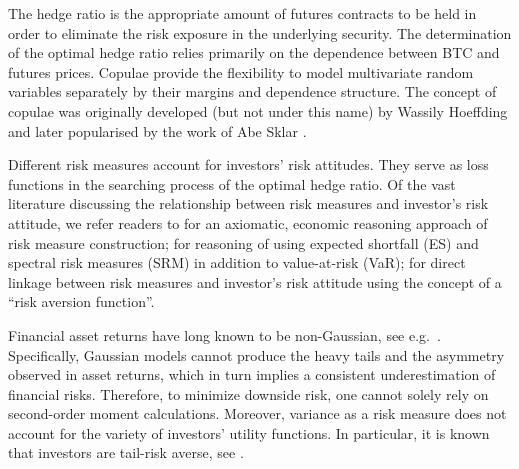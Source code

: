 \documentclass[11pt,a4paper,english]{article}
\providecommand{\natp}[1]{\textcolor{darkorange}{#1}}
\begin{document}
The hedge ratio is the appropriate amount of futures contracts to be
held in order to eliminate the risk exposure in the underlying security.  
The determination of the optimal hedge ratio relies primarily
on the dependence between BTC and futures prices.
Copulae provide the flexibility to model multivariate random variables
separately by their margins and dependence structure.
The concept of copulae was originally developed (but not under this
name) by Wassily Hoeffding \citep{hoeffding1940masstabinvariante}
and later popularised by the work of Abe Sklar \citep{Sklar1959}. \medskip

Different risk measures account for investors' risk attitudes.
They serve as loss functions in the searching process of the optimal
hedge ratio. Of the vast literature discussing the relationship between
risk measures and investor's risk attitude, we refer readers to
\citet{artzner1999coherent} for an axiomatic, economic reasoning
approach of risk measure construction;
\citet{embrechts2002correlation} for reasoning of using expected
shortfall (ES) and spectral risk measures (SRM) in addition to
value-at-risk (VaR);
\citet{Acerbi2002} for direct linkage between risk measures and
investor's risk attitude using the concept of a ``risk aversion
function''.  \medskip

Financial asset returns have long known to be non-Gaussian, see e.g.\
\citep{fama1963mandelbrot,Cont2001}. Specifically, Gaussian models
cannot produce the heavy tails and the asymmetry observed in 
asset returns, which in turn implies a consistent underestimation of
financial risks. 
Therefore, to minimize downside risk, one cannot solely rely on
second-order moment calculations. Moreover, variance as a risk measure
does not account for the variety of investors' utility functions. In
particular, it is known that  
investors are tail-risk averse, see \cite{menezes1980increasing}. \medskip
\end{document}
